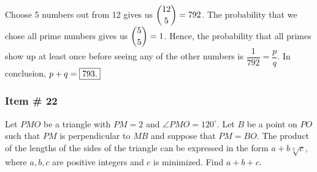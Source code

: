 \documentclass[11pt,paper=letter]{scrartcl}
\begin{document}

\sol Choose 5 numbers out from 12 gives us $\dbinom{12}{5}=792$. The probability that we chose all prime numbers gives us $\dbinom{5}{5}=1$. Hence, the probability that all primes show up at least once before seeing any of the other numbers is $\dfrac{1}{792} = \dfrac{p}{q}.$ In conclusion, $p+q=\fbox{793.}$
 
\subsubsection{Item \# 22}

\begin{probboxed}
Let $PMO$ be a triangle with $PM =2$ and $\angle PMO = 120^{\circ}$. Let $B$ be a point on $PO$ such that $PM$ is perpendicular to $MB$ and suppose that $PM=BO$. The product of the lengths of the sides of the triangle can be expressed in the form $a + b\sqrt[3]{c}$, where $a,b,c$ are positive integers and $c$ is minimized. Find $a+b+c$.
\end{probboxed}


\sol
\end{document}
